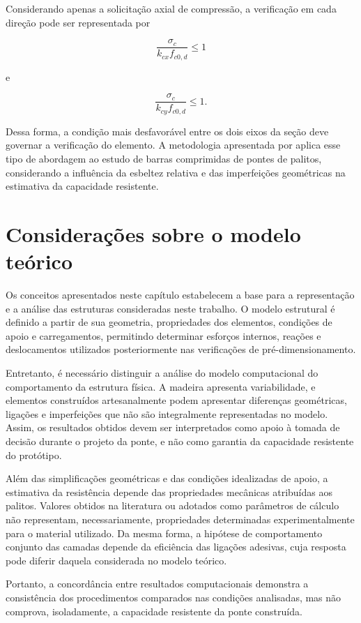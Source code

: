Considerando apenas a solicitação axial de compressão, a verificação em cada direção pode ser representada por

\begin{equation}
    \frac{\sigma_c}{k_{cx}f_{c0,d}} \leq 1
\end{equation}

e

\begin{equation}
    \frac{\sigma_c}{k_{cy}f_{c0,d}} \leq 1.
\end{equation}

Dessa forma, a condição mais desfavorável entre os dois eixos da seção deve governar a verificação do elemento. A metodologia apresentada por  aplica esse tipo de abordagem ao estudo de barras comprimidas de pontes de palitos, considerando a influência da esbeltez relativa e das imperfeições geométricas na estimativa da capacidade resistente.

\section{Considerações sobre o modelo teórico}
\label{sec:consideracoes-modelo-teorico}

Os conceitos apresentados neste capítulo estabelecem a base para a representação e a análise das estruturas consideradas neste trabalho. O modelo estrutural é definido a partir de sua geometria, propriedades dos elementos, condições de apoio e carregamentos, permitindo determinar esforços internos, reações e deslocamentos utilizados posteriormente nas verificações de pré-dimensionamento.

Entretanto, é necessário distinguir a análise do modelo computacional do comportamento da estrutura física. A madeira apresenta variabilidade, e elementos construídos artesanalmente podem apresentar diferenças geométricas, ligações e imperfeições que não são integralmente representadas no modelo. Assim, os resultados obtidos devem ser interpretados como apoio à tomada de decisão durante o projeto da ponte, e não como garantia da capacidade resistente do protótipo.

Além das simplificações geométricas e das condições idealizadas de apoio, a estimativa da resistência depende das propriedades mecânicas atribuídas aos palitos. Valores obtidos na literatura ou adotados como parâmetros de cálculo não representam, necessariamente, propriedades determinadas experimentalmente para o material utilizado. Da mesma forma, a hipótese de comportamento conjunto das camadas depende da eficiência das ligações adesivas, cuja resposta pode diferir daquela considerada no modelo teórico.

Portanto, a concordância entre resultados computacionais demonstra a consistência dos procedimentos comparados nas condições analisadas, mas não comprova, isoladamente, a capacidade resistente da ponte construída.